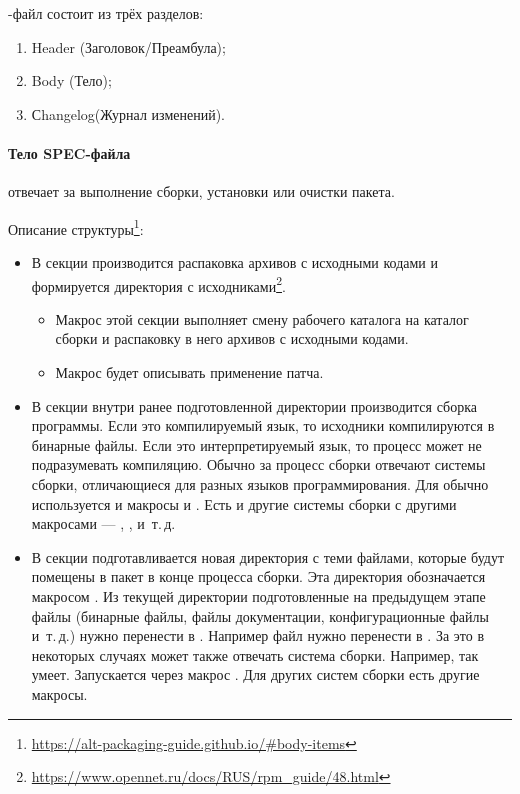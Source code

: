 -файл состоит из трёх разделов:
\begin{enumerate}
	\item Header (Заголовок/Преамбула);
	\item Body (Тело);
	\item Сhangelog(Журнал изменений).
\end{enumerate}

\paragraph{Тело SPEC-файла}отвечает за выполнение сборки, установки или очистки пакета.

Описание структуры\footnote{\href{https://alt-packaging-guide.github.io/\#body-items}{https://alt-packaging-guide.github.io/\#body-items}}: 
\begin{itemize}
	\item В секции  производится распаковка архивов с исходными кодами и формируется директория с исходниками\footnote{\href{https://www.opennet.ru/docs/RUS/rpm_guide/48.html}{https://www.opennet.ru/docs/RUS/rpm\_guide/48.html}}. 
	\begin{itemize}
		\item Макрос  этой секции выполняет смену рабочего каталога на каталог сборки и распаковку в него архивов с исходными кодами.
		
		\item Макрос  будет описывать применение патча.
	\end{itemize}
	
	\item В секции  внутри ранее подготовленной директории производится сборка программы. Если это компилируемый язык, то исходники компилируются в бинарные файлы. Если это интерпретируемый язык, то процесс может не подразумевать компиляцию. Обычно за процесс сборки отвечают системы сборки, отличающиеся для разных языков программирования. Для  обычно используется  и макросы  и . Есть и другие системы сборки с другими макросами --- , ,  и~т.\,д.
	
	\item В секции  подготавливается новая директория с теми файлами, которые будут помещены в  пакет в конце процесса сборки. Эта директория обозначается макросом . Из текущей директории подготовленные на предыдущем этапе файлы (бинарные файлы, файлы документации, конфигурационные файлы и~т.\,д.) нужно перенести в . Например файл  нужно перенести в . За это в некоторых случаях может также отвечать система сборки. Например,  так умеет. Запускается через макрос . Для других систем сборки есть другие макросы.
	

\end{itemize}
